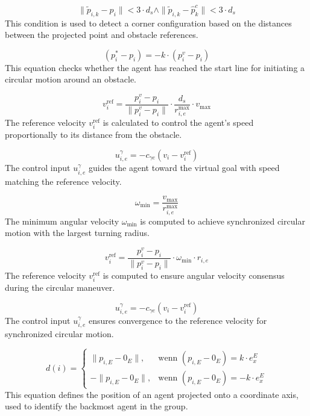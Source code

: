 \documentclass[conference]{IEEEtran}
\begin{document}
\begin{equation}
\| \tilde{p}_{i,k} - p_i \| < 3 \cdot d_s \wedge \| \tilde{p}_{i,k} - \hat{p}^c_k \| < 3 \cdot d_s
\label{eq:39}
\end{equation}
This condition is used to detect a corner configuration based on the distances between the projected point and obstacle references.

\begin{equation}
( p^*_i - p_i ) = -k \cdot ( p^v_i - p_i )
\label{eq:40}
\end{equation}
This equation checks whether the agent has reached the start line for initiating a circular motion around an obstacle.

\begin{equation}
v^{\text{ref}}_i = \frac{p^v_i - p_i}{\| p^v_i - p_i \|} \cdot \frac{d_s}{r^{\text{max}}_{i,e}} \cdot v_{\text{max}}
\label{eq:41}
\end{equation}
The reference velocity $v^{\text{ref}}_i$ is calculated to control the agent’s speed proportionally to its distance from the obstacle.

\begin{equation}
u^{\gamma}_{i,e} = -c_{\gamma e} ( v_i - v^{\text{ref}}_i )
\label{eq:42}
\end{equation}
The control input $u^{\gamma}_{i,e}$ guides the agent toward the virtual goal with speed matching the reference velocity.

\begin{equation}
\omega_{\text{min}} = \frac{v_{\text{max}}}{r^{\text{max}}_{i,e}}
\label{eq:43}
\end{equation}
The minimum angular velocity $\omega_{\text{min}}$ is computed to achieve synchronized circular motion with the largest turning radius.

\begin{equation}
v^{\text{ref}}_i = \frac{p^v_i - p_i}{\| p^v_i - p_i \|} \cdot \omega_{\text{min}} \cdot r_{i,e}
\label{eq:44}
\end{equation}
The reference velocity $v^{\text{ref}}_i$ is computed to ensure angular velocity consensus during the circular maneuver.

\begin{equation}
u^{\gamma}_{i,e} = -c_{\gamma e} ( v_i - v^{\text{ref}}_i )
\label{eq:45}
\end{equation}
The control input $u^{\gamma}_{i,e}$ ensures convergence to the reference velocity for synchronized circular motion.

\begin{equation}
d(i) =
\begin{cases}
\| p_{i,E} - 0_E \|, & \text{wenn } (p_{i,E} - 0_E) = k \cdot e_x^E \\
-\| p_{i,E} - 0_E \|, & \text{wenn } (p_{i,E} - 0_E) = -k \cdot e_x^E
\end{cases}
\label{eq:46}
\end{equation}
This equation defines the position of an agent projected onto a coordinate axis, used to identify the backmost agent in the group.
\end{document}
